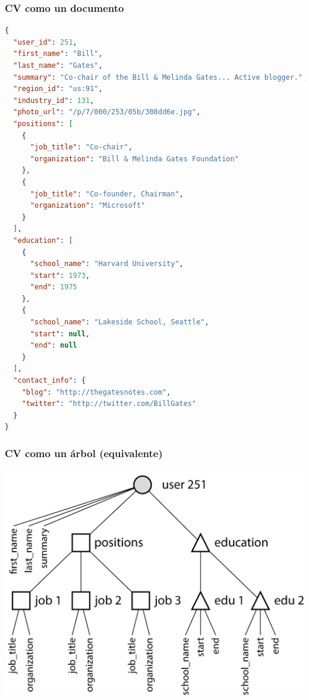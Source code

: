 \documentclass[14pt]{beamer}
\begin{document}
\begin{frame}[fragile]
  \frametitle{CV como un documento}
\begin{lstlisting}[language=json,basicstyle=\tiny\tt]
{
  "user_id": 251,
  "first_name": "Bill",
  "last_name": "Gates",
  "summary": "Co-chair of the Bill & Melinda Gates... Active blogger.",
  "region_id": "us:91",
  "industry_id": 131,
  "photo_url": "/p/7/000/253/05b/308dd6e.jpg",
  "positions": [
    {
      "job_title": "Co-chair",
      "organization": "Bill & Melinda Gates Foundation"
    },
    {
      "job_title": "Co-founder, Chairman",
      "organization": "Microsoft"
    }
  ],
  "education": [
    {
      "school_name": "Harvard University",
      "start": 1973,
      "end": 1975
    },
    {
      "school_name": "Lakeside School, Seattle",
      "start": null,
      "end": null
    }
  ],
  "contact_info": {
    "blog": "http://thegatesnotes.com",
    "twitter": "http://twitter.com/BillGates"
  }
}
\end{lstlisting}
\end{frame}

\begin{frame}
  \frametitle{CV como un árbol (equivalente)}
\centering\includegraphics[height=.85\textheight]{img/tree}
\end{frame}
\end{document}
